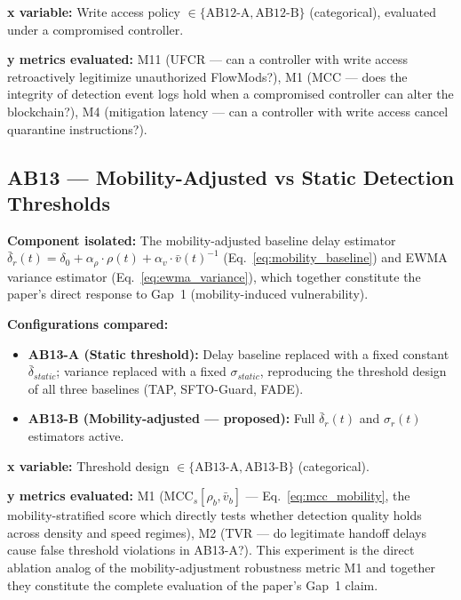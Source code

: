 \documentclass[12pt, a4paper]{report}
\begin{document}
{{\textbf{x variable:} Write access policy
$\in \{\text{AB12-A}, \text{AB12-B}\}$ (categorical),
evaluated under a compromised controller.

\textbf{y metrics evaluated:} M11 (UFCR — can a
controller with write access retroactively legitimize
unauthorized FlowMods?), M1 (MCC — does the integrity
of detection event logs hold when a compromised
controller can alter the blockchain?), M4 (mitigation
latency — can a controller with write access cancel
quarantine instructions?).


\subsection{AB13 — Mobility-Adjusted vs Static
Detection Thresholds}
\label{sec:ab13}

\textbf{Component isolated:}
The mobility-adjusted baseline delay estimator
$\bar{\delta}_r(t) = \delta_0 + \alpha_\rho \cdot
\rho(t) + \alpha_v \cdot \bar{v}(t)^{-1}$
(Eq.~\ref{eq:mobility_baseline}) and \ac{EWMA}
variance estimator (Eq.~\ref{eq:ewma_variance}),
which together constitute the paper's direct
response to Gap~1 (mobility-induced vulnerability).

\textbf{Configurations compared:}
\begin{itemize}
    \item \textbf{AB13-A (Static threshold):}
    Delay baseline replaced with a fixed constant
    $\bar{\delta}_{static}$; variance replaced
    with a fixed $\sigma_{static}$, reproducing
    the threshold design of all three baselines
    (TAP, SFTO-Guard, FADE).
    \item \textbf{AB13-B (Mobility-adjusted —
    proposed):} Full $\bar{\delta}_r(t)$ and
    $\sigma_r(t)$ estimators active.
\end{itemize}

\textbf{x variable:} Threshold design
$\in \{\text{AB13-A}, \text{AB13-B}\}$ (categorical).

\textbf{y metrics evaluated:} M1
($\text{MCC}_s[\rho_b, \bar{v}_b]$ —
Eq.~\ref{eq:mcc_mobility}, the mobility-stratified
score which directly tests whether detection quality
holds across density and speed regimes), M2 (TVR —
do legitimate handoff delays cause false threshold
violations in AB13-A?). This experiment is the
direct ablation analog of the mobility-adjustment
robustness metric M1 and together they constitute
the complete evaluation of the paper's Gap~1 claim.

}}
\end{document}
